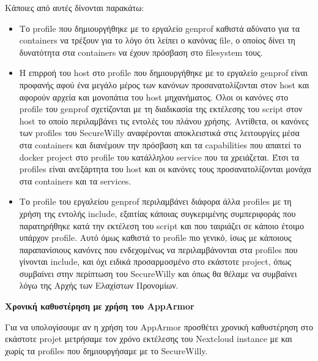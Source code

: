 Κάποιες από αυτές δίνονται παρακάτω:
\begin{itemize}
\item Το \en profile\gr{} που δημιουργήθηκε με το εργαλείο \en genprof\gr{} καθιστά αδύνατο για τα \en containers\gr{} να τρέξουν για το λόγο ότι λείπει ο κανόνας \en file\gr{}, ο οποίος δίνει τη δυνατότητα στα \en containers\gr{} να έχουν πρόσβαση στο \en filesystem\gr{} τους.

\item Η επιρροή του \en host\gr{} στο \en profile\gr{} που δημιουργήθηκε με το εργαλείο \en genprof\gr{} είναι προφανής αφού ένα μεγάλο μέρος των κανόνων προσανατολίζονται στον \en host\gr{} και αφορούν αρχεία και μονοπάτια του \en host\gr{} μηχανήματος. Όλοι οι κανόνες στο \en profile\gr{} του \en genprof\gr{} σχετίζονται με τη διαδικασία της εκτέλεσης του \en script\gr{} στον \en host\gr{} το οποίο περιλαμβάνει τις εντολές του πλάνου χρήσης. Αντίθετα, οι κανόνες των \en profiles\gr{} του \en SecureWilly\gr{} αναφέρονται αποκλειστικά στις λειτουργίες μέσα στα \en containers\gr{} και διανέμουν την πρόσβαση και τα \en capabilities\gr{} που απαιτεί το \en docker project\gr{} στο \en profile\gr{} του κατάλληλου \en service\gr{} που τα χρειάζεται. Έτσι τα \en profiles\gr{} είναι ανεξάρτητα του \en host\gr{} και οι κανόνες τους προσανατολίζονται μονάχα στα \en containers\gr{} και τα \en services\gr{}.

\item Το \en profile\gr{} του εργαλείου \en genprof\gr{} περιλαμβάνει διάφορα άλλα \en profiles\gr{} με τη χρήση της εντολής \en include\gr{}, εξαιτίας κάποιας συγκεριμένης συμπεριφοράς που παρατηρήθηκε κατά την εκτέλεση του \en script\gr{} και που ταιριάζει σε κάποιο έτοιμο υπάρχον \en profile\gr{}. Αυτό όμως καθιστά το \en profile\gr{} πιο γενικό, ίσως με κάποιους παραπανίσιους κανόνες που ενδεχομένως να περιλαμβάνονται στα \en profiles\gr{} που γίνονται \en include\gr{}, και όχι ειδικά προσαρμοσμένο στο εκάστοτε \en project\gr{}, όπως συμβαίνει στην περίπτωση του \en SecureWilly\gr{} και όπως θα θέλαμε να συμβαίνει λόγω της Αρχής των Ελαχίστων Προνομίων.
\end{itemize}

\hfill\break
\textbf{Χρονική καθυστέρηση με χρήση του \en AppArmor\gr{}}
\hfill\break

Για να υπολογίσουμε αν η χρήση του \en AppArmor\gr{} προσθέτει χρονική καθυστέρηση στο εκάστοτε \en projet\gr{} μετρήσαμε τον χρόνο εκτέλεσης του \en Nextcloud instance\gr{} με και χωρίς τα \en profiles\gr{} που δημιουργήσαμε με το \en SecureWilly\gr{}.


